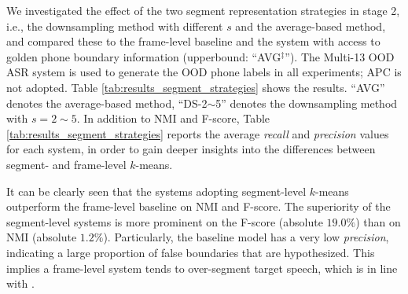 \documentclass[a4paper]{article}
\begin{document}
\begin{table}[!t]
\renewcommand\arraystretch{0.4}
\centering
\caption{NMI (row 2) and F-score (row 3) performances w.r.t different numbers of clusters (row 1).}
\label{tab:results_num_clusters}
\end{table}

We investigated the effect of the two segment representation strategies in stage 2, i.e., the downsampling method with different $s$ and the average-based method, and compared these to the frame-level baseline and the system with access to golden phone boundary information (upperbound: ``AVG$^\ddagger$''). The Multi-13 OOD ASR system is used to generate the OOD phone labels in all experiments; APC is not adopted. 
Table \ref{tab:results_segment_strategies} shows the results. ``AVG'' denotes the average-based method, ``DS-2$\sim$5'' denotes the downsampling method with $s=2\sim5$.
In addition to NMI and F-score, Table \ref{tab:results_segment_strategies}   reports  the average  \textit{recall} and \textit{precision} values for each system, in order to gain deeper insights into the differences between segment- and frame-level $k$-means.

It can be clearly seen that the systems adopting segment-level $k$-means outperform the frame-level baseline  on NMI and F-score. The superiority of the segment-level systems is more prominent on the F-score (absolute $19.0\%$)  than on NMI (absolute $1.2\%$). Particularly, the baseline model has a very low \textit{precision}, indicating a large proportion of false boundaries  that are hypothesized. 
This implies a frame-level system tends to over-segment target speech, which is in line with   \cite{wu2018optimizing,feng2019_TASLP}.  
\end{document}
